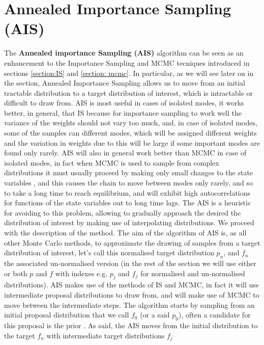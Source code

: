 \documentclass[12pt,mythesisstyle]{report}
\begin{document}
\section{Annealed Importance Sampling (AIS)}\label{section: AIS}
\begin{comment}
LEO: IN THE BEGINNING IT IS COPIED FROM THE AIS PAPER, CHANGE IT IN STEADY STATE
\end{comment}
The \textbf{Annealed importance Sampling (AIS)} algorithm can be seen as an enhancement \cite{annealedis} to the Importance Sampling and MCMC tecniques introduced in sections \ref{section:IS} and \ref{section: mcmc}. In particular, as we will see later on in the section, Annealed Importance Sampling allows us to move from an initial tractable distribution to a target distribution of interest, which is intractable or difficult to draw from.  AIS is most useful in cases of isolated modes, it works better, in general, that IS because for importance sampling to work well the variance of the weights should not vary too much, and, in case of isolated modes, some of the samples can different modes, which will be assigned different weights and the variation in weights due to this will be large if some important modes are found only rarely. AIS will also in general work better than MCMC in case of isolated modes, in fact when MCMC is used to sample from complex distributions it must usually proceed by making only small changes to the state variables \cite{annealedis}, and this causes the chain to move between modes only rarely, and so to take a long time to reach equilibrium, and will exhibit high autocorrelations for functions of the state variables out to long time lags. The AIS is a heuristic for avoiding to this problem, allowing to  gradually approach the desired the distribution of interest by making use of interpolating distributions.
We proceed with the description of the method. The aim of the algorithm of AIS \cite{annealedis} is, as all other Monte Carlo methods, to approximate the drawing of samples from a target distribution of interest, let's call this normalised target distribution $p_n$, and $f_n$ the associated un-normalised version (in the rest of the section we will use either or both $p$ and $f$ with indexes e.g. $p_j$ and $f_j$ for normalised and un-normalised distributions). AIS makes use of the methods of IS and MCMC, in fact it will use intermediate proposal distributions to draw from, and will make use of MCMC to move between the intermediate steps. The algorithm starts by sampling from an initial proposal distribution that we call $f_0$ (or a said $p_0$), often a candidate for this proposal is the prior \cite{annealedis}. As said, the AIS moves from the initial distribution to the target $f_n$ with intermediate target distributions $f_j$
\end{document}
